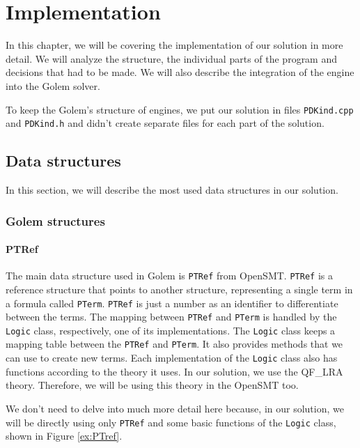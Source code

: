 \chapter{Implementation}
\noindent In this chapter, we will be covering the implementation of our solution in more detail. We will analyze the structure, the individual parts of the program and decisions that had to be made. We will also describe the integration of the engine into the Golem solver.

To keep the Golem's structure of engines, we put our solution in files 
\texttt{PDKind.cpp} and \texttt{PDKind.h} and didn't create separate files for each part of the solution.

\section{Data structures}
\noindent In this section, we will describe the most used data structures in our solution. 
\subsection{Golem structures}

\subsubsection{PTRef}
\noindent The main data structure used in Golem is \texttt{PTRef} from OpenSMT. \texttt{PTRef} is a reference structure that points to another structure, representing a single term in a formula called \texttt{PTerm}. \texttt{PTRef} is just a number as an identifier to differentiate between the terms. The mapping between \texttt{PTRef} and \texttt{PTerm} is handled by the \texttt{Logic} class, respectively, one of its implementations. The \texttt{Logic} class keeps a mapping table between the \texttt{PTRef} and \texttt{PTerm}. It also provides methods that we can use to create new terms. Each implementation of the \texttt{Logic} class also has functions according to the theory it uses. In our solution, we use the QF\_LRA theory. Therefore, we will be using this theory in the OpenSMT too. 

We don't need to delve into much more detail here because, in our solution, we will be directly using only \texttt{PTRef} and some basic functions of the \texttt{Logic} class, shown in Figure \ref{ex:PTref}.

